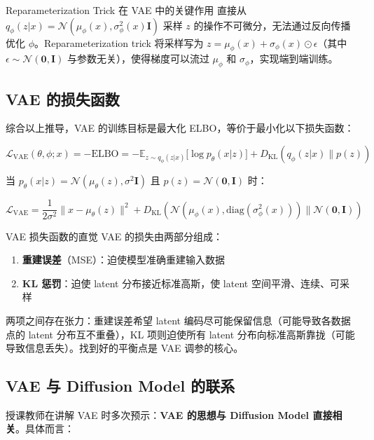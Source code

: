 \begin{knowledgebox}{Reparameterization Trick 在 VAE 中的关键作用}
直接从 $q_\phi(z|x) = \mathcal{N}(\mu_\phi(x), \sigma^2_\phi(x) \mathbf{I})$ 采样 $z$ 的操作不可微分，无法通过反向传播优化 $\phi$。Reparameterization trick 将采样写为 $z = \mu_\phi(x) + \sigma_\phi(x) \odot \epsilon$（其中 $\epsilon \sim \mathcal{N}(\mathbf{0}, \mathbf{I})$ 与参数无关），使得梯度可以流过 $\mu_\phi$ 和 $\sigma_\phi$，实现端到端训练。
\end{knowledgebox}

\subsection{VAE 的损失函数}

综合以上推导，VAE 的训练目标是最大化 ELBO，等价于最小化以下损失函数：

$$\mathcal{L}_{\text{VAE}}(\theta, \phi; x) = -\text{ELBO} = -\mathbb{E}_{z \sim q_\phi(z|x)}{[}\log p_\theta(x|z){]} + D_{\mathrm{KL}}(q_\phi(z|x) \| p(z))$$

当 $p_\theta(x|z) = \mathcal{N}(\mu_\theta(z), \sigma^2 \mathbf{I})$ 且 $p(z) = \mathcal{N}(\mathbf{0}, \mathbf{I})$ 时：

$$\mathcal{L}_{\text{VAE}} = \frac{1}{2\sigma^2}\|x - \mu_\theta(z)\|^2 + D_{\mathrm{KL}}(\mathcal{N}(\mu_\phi(x), \text{diag}(\sigma^2_\phi(x))) \| \mathcal{N}(\mathbf{0}, \mathbf{I}))$$

\begin{importantbox}{VAE 损失函数的直觉}
VAE 的损失由两部分组成：
\begin{enumerate}
    \item \textbf{重建误差}（MSE）：迫使模型准确重建输入数据
    \item \textbf{KL 惩罚}：迫使 latent 分布接近标准高斯，使 latent 空间平滑、连续、可采样
\end{enumerate}
两项之间存在张力：重建误差希望 latent 编码尽可能保留信息（可能导致各数据点的 latent 分布互不重叠），KL 项则迫使所有 latent 分布向标准高斯靠拢（可能导致信息丢失）。找到好的平衡点是 VAE 调参的核心。
\end{importantbox}

\subsection{VAE 与 Diffusion Model 的联系}

授课教师在讲解 VAE 时多次预示：\textbf{VAE 的思想与 Diffusion Model 直接相关}。具体而言：

